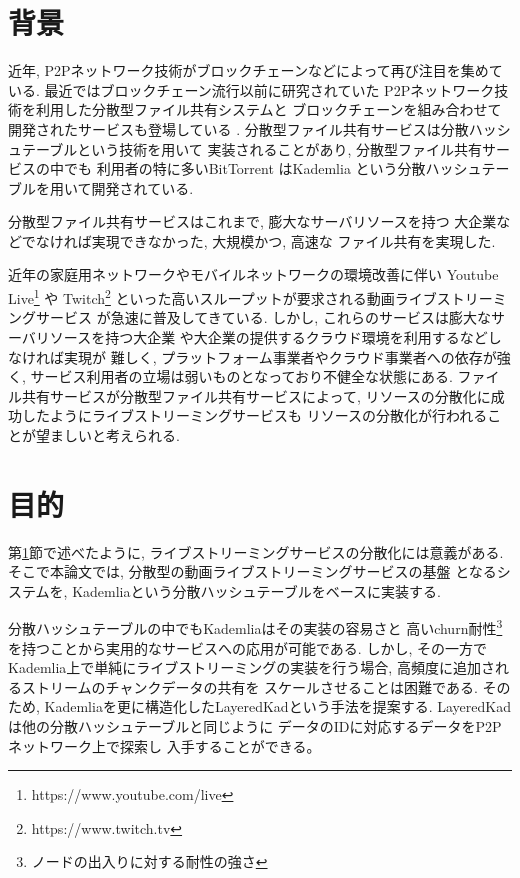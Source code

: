 \documentclass[sotsuron]{jcsie}
\begin{document}
\section{背景}
\label{sec:haikei}
近年, P2Pネットワーク技術がブロックチェーンなどによって再び注目を集めている.
最近ではブロックチェーン流行以前に研究されていた
P2Pネットワーク技術を利用した分散型ファイル共有システムと
ブロックチェーンを組み合わせて開発されたサービスも登場している
\cite{BitTorre1:online}.
分散型ファイル共有サービスは分散ハッシュテーブルという技術を用いて
実装されることがあり, 分散型ファイル共有サービスの中でも
利用者の特に多いBitTorrent\cite{BitTorre59:online}
はKademlia\cite{maymounkov2002kademlia}\cite{高野祐輝2010nat}
という分散ハッシュテーブルを用いて開発されている.

分散型ファイル共有サービスはこれまで, 膨大なサーバリソースを持つ
大企業などでなければ実現できなかった, 大規模かつ, 高速な
ファイル共有を実現した.

近年の家庭用ネットワークやモバイルネットワークの環境改善に伴い
Youtube Live\footnote{https://www.youtube.com/live} や 
Twitch\footnote{https://www.twitch.tv} 
といった高いスループットが要求される動画ライブストリーミングサービス
が急速に普及してきている.
しかし, これらのサービスは膨大なサーバリソースを持つ大企業
や大企業の提供するクラウド環境を利用するなどしなければ実現が
難しく,  プラットフォーム事業者やクラウド事業者への依存が強く, 
サービス利用者の立場は弱いものとなっており不健全な状態にある.
ファイル共有サービスが分散型ファイル共有サービスによって, 
リソースの分散化に成功したようにライブストリーミングサービスも
リソースの分散化が行われることが望ましいと考えられる.

\section{目的}
第\ref{sec:haikei}節で述べたように, 
ライブストリーミングサービスの分散化には意義がある.
そこで本論文では, 分散型の動画ライブストリーミングサービスの基盤
となるシステムを, Kademliaという分散ハッシュテーブルをベースに実装する.

分散ハッシュテーブルの中でもKademliaはその実装の容易さと
高いchurn耐性\footnote{ノードの出入りに対する耐性の強さ}
を持つことから実用的なサービスへの応用が可能である.
しかし, その一方でKademlia上で単純にライブストリーミングの実装を行う場合, 
高頻度に追加されるストリームのチャンクデータの共有を
スケールさせることは困難である.
そのため, Kademliaを更に構造化したLayeredKadという手法を提案する.
LayeredKadは他の分散ハッシュテーブルと同じように
データのIDに対応するデータをP2Pネットワーク上で探索し
入手することができる。
\end{document}
